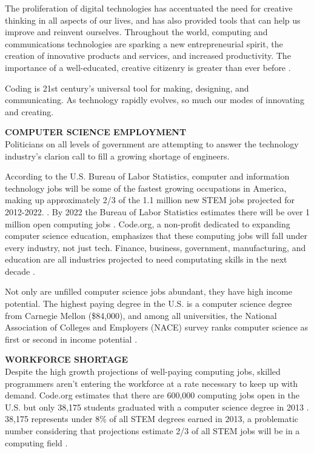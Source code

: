 \begin{blockquote} 
	The proliferation of digital technologies has accentuated the need for creative thinking in all aspects of our lives, and has also provided tools that can help us improve and reinvent ourselves. Throughout the world, computing and communications technologies are sparking a new entrepreneurial spirit, the creation of innovative products and services, and increased productivity. The importance of a well-educated, creative citizenry is greater than ever before \cite{resdig}.
\end{blockquote}
Coding is 21st century's universal tool for making, designing, and communicating. As technology rapidly evolves, so much our modes of innovating and creating. \par

\textbf{COMPUTER SCIENCE EMPLOYMENT} \\
Politicians on all levels of government are attempting to answer the technology industry's clarion call to fill a growing shortage of engineers.  \par
According to the U.S. Bureau of Labor Statistics, computer and information technology jobs will be some of the fastest growing occupations in America, making up approximately 2/3 of the 1.1 million new STEM jobs projected for 2012-2022. \cite{laborstats}. By 2022 the Bureau of Labor Statistics estimates there will be over 1 million open computing jobs \cite{laborstats}. Code.org, a non-profit dedicated to expanding computer science education, emphasizes that these computing jobs will fall under every industry, not just tech. Finance, business, government, manufacturing, and education are all industries projected to need computating skills in the next decade \cite{codeorgstats}.\par
Not only are unfilled computer science jobs abundant, they have high income potential. The highest paying degree in the U.S. is a computer science degree from Carnegie Mellon (\$84,000), and among all universities, the National Association of Colleges and Employers (NACE) survey ranks computer science as first or second in income potential \cite{forbeshigh}. \par
\textbf{WORKFORCE SHORTAGE} \\
Despite the high growth projections of well-paying computing jobs, skilled programmers aren't entering the workforce at a rate necessary to keep up with demand. Code.org estimates that there are 600,000 computing jobs open in the U.S. but only 38,175 students graduated with a computer science degree in 2013 \cite{codeorgstats}. 38,175 represents under 8\% of all STEM degrees earned in 2013, a problematic number considering that projections estimate 2/3 of all STEM jobs will be in a computing field \cite{laborstats}. \par
